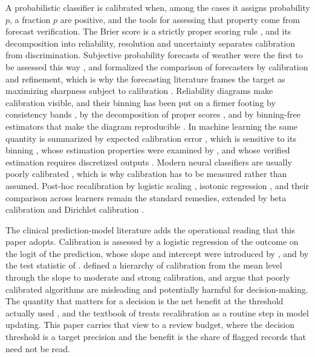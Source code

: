 A probabilistic classifier is calibrated when, among the cases it assigns probability $p$, a
fraction $p$ are positive, and the tools for assessing that property come from forecast
verification. The Brier score \citep{brier1950verification} is a strictly proper scoring rule
\citep{gneiting2007strictly}, and its decomposition into reliability, resolution and
uncertainty \citep{murphy1973new} separates calibration from discrimination. Subjective
probability forecasts of weather were the first to be assessed this way
\citep{murphy1977reliability}, and \citet{degroot1983forecasters} formalized the comparison of forecasters by calibration and refinement, which is why the forecasting literature frames the target as maximizing sharpness subject to calibration \citep{gneiting2007probabilis}.
Reliability diagrams make calibration visible, and their binning has been put on a firmer
footing by consistency bands \citep{brocker2007diagrams}, by the decomposition of proper
scores \citep{brocker2009reliability}, and by binning-free estimators that make the diagram
reproducible \citep{dimitriadis2021stable,gneiting2023regression,dimitriadis2024evaluating}.
In machine learning the same quantity is summarized by expected calibration error
\citep{naeini2015obtaining}, which is sensitive to its binning \citep{nixon2019measuring},
whose estimation properties were examined by \citet{vaicenavicius2019evaluating}, and whose
verified estimation requires discretized outputs \citep{kumar2019verified}. Modern neural classifiers are usually poorly calibrated \citep{guo2017calibration}, which is why calibration has to be measured rather than assumed. Post-hoc recalibration by logistic scaling
\citep{platt1999probabilistic}, isotonic regression \citep{zadrozny2002transformi}, and
their comparison across learners \citep{niculescumiz2005predicting} remain the standard
remedies, extended by beta calibration \citep{kull2017beta} and Dirichlet calibration
\citep{kull2019dirichlet}.

The clinical prediction-model literature adds the operational reading that this paper adopts.
Calibration is assessed by a logistic regression of the outcome on the logit of the prediction,
whose slope and intercept were introduced by \citet{cox1958two}, and by the test statistic of
\citet{spiegelhalter1986probabilistic}. \citet{van2016a} defined a hierarchy of calibration
from the mean level through the slope to moderate and strong calibration, and
\citet{van2019calibratio} argue that poorly calibrated algorithms are misleading and potentially harmful for decision-making. The quantity that matters for a decision is the net benefit
at the threshold actually used \citep{vickers2006decision,steyerberg2010assessing}, and the
textbook of \citet{steyerberg2009book} treats recalibration as a routine step in model
updating. This paper carries that view to a review budget, where the decision threshold is a
target precision and the benefit is the share of flagged records that need not be read.

